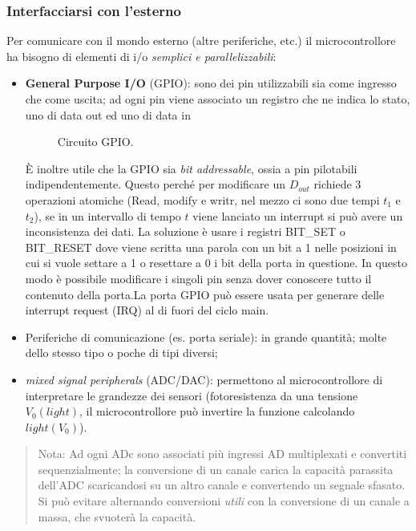 \documentclass[
]{book}
\providecommand{\tightlist}{%
  \setlength{\itemsep}{0pt}\setlength{\parskip}{0pt}}
\begin{document}
\subsubsection{Interfacciarsi con
l'esterno}\label{interfacciarsi-con-lesterno}

Per comunicare con il mondo esterno (altre periferiche, etc.) il
microcontrollore ha bisogno di elementi di i/o \emph{semplici e
parallelizzabili}:

\begin{itemize}
\tightlist
\item
  \textbf{General Purpose I/O} (GPIO): sono dei pin utilizzabili sia
  come ingresso che come uscita; ad ogni pin viene associato un registro
  che ne indica lo stato, uno di data out ed uno di data in

  \begin{figure}[H]
    \centering
    \resizebox{0.5\textwidth}{!}{}
    \caption{Circuito GPIO.}
    \end{figure}

  È inoltre utile che la GPIO sia \emph{bit addressable}, ossia a pin
  pilotabili indipendentemente. Questo perché per modificare un
  \(D_{out}\) richiede 3 operazioni atomiche (Read, modify e writr, nel
  mezzo ci sono due tempi \(t_1\) e \(t_2\)), se in un intervallo di
  tempo \(t\) viene lanciato un interrupt si può avere un inconsistenza
  dei dati. La soluzione è usare i registri BIT\_SET o BIT\_RESET dove
  viene scritta una parola con un bit a 1 nelle posizioni in cui si
  vuole settare a 1 o resettare a 0 i bit della porta in questione. In
  questo modo è possibile modificare i singoli pin senza dover conoscere
  tutto il contenuto della porta.\newline La porta GPIO può essere usata
  per generare delle interrupt request (IRQ) al di fuori del ciclo main.
\item
  Periferiche di comunicazione (es. porta seriale): in grande quantità;
  molte dello stesso tipo o poche di tipi diversi;
\item
  \emph{mixed signal peripherals} (ADC/DAC): permettono al
  microcontrollore di interpretare le grandezze dei sensori
  (fotoresistenza da una tensione \(V_{0}(light)\), il microcontrollore
  può invertire la funzione calcolando \(light(V_{0})\)).
\end{itemize}

\begin{quote}
Nota: Ad ogni ADc sono associati più ingressi AD multiplexati e
convertiti sequenzialmente; la conversione di un canale carica la
capacità parassita dell'ADC scaricandosi su un altro canale e
convertendo un segnale sfasato. Si può evitare alternando conversioni
\emph{utili} con la conversione di un canale a massa, che svuoterà la
capacità.
\end{quote}
\end{document}
